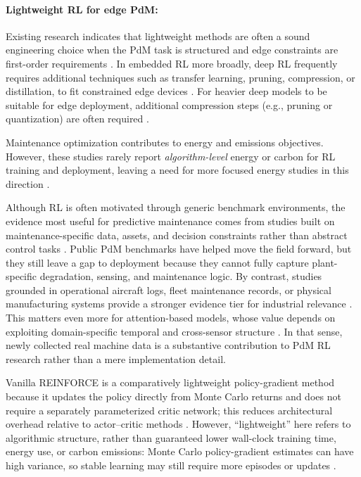 \documentclass[sn-basic]{sn-jnl}%
\begin{document}
\paragraph{Lightweight RL for edge PdM:}
Existing research indicates that lightweight methods are often a sound engineering choice when the PdM task is structured and edge constraints are first-order requirements \cite{Compare2020, Njor2024, Pandey2023}. In embedded RL more broadly, deep RL frequently requires additional techniques such as transfer learning, pruning, compression, or distillation, to fit constrained edge devices \cite{Jang2020, Szydlo2022, Xu2022}. For heavier deep models to be suitable for edge deployment, additional compression steps (e.g., pruning or quantization) are often required \cite{Pandey2023, Jang2020, Xu2022}.

Maintenance optimization contributes to energy and emissions objectives. However, these studies rarely report \emph{algorithm-level} energy or carbon for RL training and deployment, leaving a need for more focused energy studies in this direction \cite{Banyai2021, Banyai2022, JasiulewiczKaczmarek2024}.

Although RL is often motivated through generic benchmark environments, the evidence most useful for predictive maintenance comes from studies built on maintenance-specific data, assets, and decision constraints rather than abstract control tasks \cite{Andrade2021Aircraft,Dangut2022RareFailure,Zhao2024,Siraskar2025}. Public PdM benchmarks have helped move the field forward, but they still leave a gap to deployment because they cannot fully capture plant-specific degradation, sensing, and maintenance logic. By contrast, studies grounded in operational aircraft logs, fleet maintenance records, or physical manufacturing systems provide a stronger evidence tier for industrial relevance \cite{Andrade2021Aircraft,Dangut2022RareFailure,Chen2024DigitalTwin}. This matters even more for attention-based models, whose value depends on exploiting domain-specific temporal and cross-sensor structure \cite{Zhao2024}. In that sense, newly collected real machine data is a substantive contribution to PdM RL research rather than a mere implementation detail.

Vanilla \textsc{REINFORCE} is a comparatively lightweight policy-gradient method because it updates the policy directly from Monte Carlo returns and does not require a separately parameterized critic network; this reduces architectural overhead relative to actor--critic methods \cite{Williams1992,Sutton1999,Sutton2001}. However, ``lightweight'' here refers to algorithmic structure, rather than guaranteed lower wall-clock training time, energy use, or carbon emissions: Monte Carlo policy-gradient estimates can have high variance, so stable learning may still require more episodes or updates \cite{Greensmith2005}. 
\end{document}
